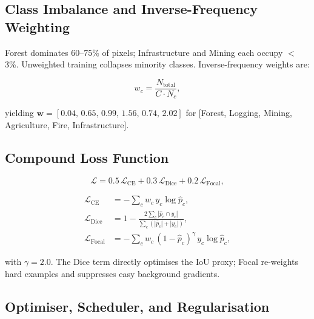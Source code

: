 \documentclass[10pt,conference]{IEEEtran}
\begin{document}
\subsection{Class Imbalance and Inverse-Frequency Weighting}

Forest dominates 60--75\% of pixels; Infrastructure and Mining each occupy
$<$3\%. Unweighted training collapses minority classes. Inverse-frequency
weights are:

\begin{equation}
  w_c = \frac{N_{\text{total}}}{C \cdot N_c},
  \label{eq:classweights}
\end{equation}

yielding $\mathbf{w}{=}[0.04,\,0.65,\,0.99,\,1.56,\,0.74,\,2.02]$ for
[Forest, Logging, Mining, Agriculture, Fire, Infrastructure].

\subsection{Compound Loss Function}

\begin{equation}
  \mathcal{L} = 0.5\,\mathcal{L}_{\text{CE}} + 0.3\,\mathcal{L}_{\text{Dice}}
                + 0.2\,\mathcal{L}_{\text{Focal}},
  \label{eq:loss}
\end{equation}

\begin{align}
  \mathcal{L}_{\text{CE}}    &= -\sum_c w_c\,y_c\log\hat{p}_c, \label{eq:ce}\\
  \mathcal{L}_{\text{Dice}}  &= 1 - \frac{2\sum_c |\hat{p}_c \cap y_c|}
                                         {\sum_c (|\hat{p}_c|+|y_c|)}, \label{eq:dice}\\
  \mathcal{L}_{\text{Focal}} &= -\sum_c w_c\,(1-\hat{p}_c)^{\gamma}\,y_c\log\hat{p}_c,
  \label{eq:focal}
\end{align}

with $\gamma{=}2.0$. The Dice term directly optimises the IoU proxy; Focal
re-weights hard examples and suppresses easy background gradients.

\subsection{Optimiser, Scheduler, and Regularisation}
\end{document}
